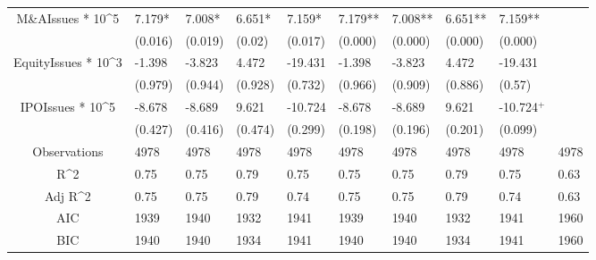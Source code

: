 \documentclass{article}
\begin{document}
\begin{table}[H]
\begin{tabular}{|clllllllll|}
  M\&AIssues * 10^5 & 7.179* & 7.008* & 6.651* & 7.159* & 7.179** & 7.008** & 6.651** & 7.159** &  \\ 
   & (0.016) & (0.019) & (0.02) & (0.017) & (0.000) & (0.000) & (0.000) & (0.000) &  \\ 
  EquityIssues * 10^3 & -1.398 & -3.823 & 4.472 & -19.431 & -1.398 & -3.823 & 4.472 & -19.431 &  \\ 
   & (0.979) & (0.944) & (0.928) & (0.732) & (0.966) & (0.909) & (0.886) & (0.57) &  \\ 
  IPOIssues * 10^5 & -8.678 & -8.689 & 9.621 & -10.724 & -8.678 & -8.689 & 9.621 & -10.724$^{+}$ &  \\ 
   & (0.427) & (0.416) & (0.474) & (0.299) & (0.198) & (0.196) & (0.201) & (0.099) &  \\ 
  \hline 
 Observations & 4978 & 4978 & 4978 & 4978 & 4978 & 4978 & 4978 & 4978 & 4978 \\ 
  R^2 & 0.75 & 0.75 & 0.79 & 0.75 & 0.75 & 0.75 & 0.79 & 0.75 & 0.63 \\ 
  Adj R^2 & 0.75 & 0.75 & 0.79 & 0.74 & 0.75 & 0.75 & 0.79 & 0.74 & 0.63 \\ 
  AIC & 1939 & 1940 & 1932 & 1941 & 1939 & 1940 & 1932 & 1941 & 1960 \\ 
  BIC & 1940 & 1940 & 1934 & 1941 & 1940 & 1940 & 1934 & 1941 & 1960 \\ 
   \hline
\end{tabular}
 
\end{table}
\end{document}
